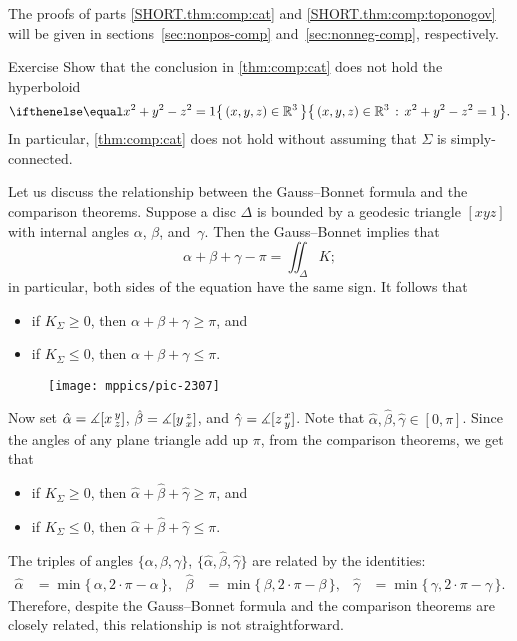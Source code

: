 The proofs of parts \ref{SHORT.thm:comp:cat} and \ref{SHORT.thm:comp:toponogov} will be given in sections~\ref{sec:nonpos-comp} and~\ref{sec:nonneg-comp}, respectively.

\begin{thm}{Exercise}\label{ex:thm:comp:cat:nsc}
Show that the conclusion in \ref{thm:comp:cat} does not hold the hyperboloid
\[\set{(x,y,z)\in\mathbb{R}^3}{x^2+y^2-z^2=1}.\]
In particular, \ref{thm:comp:cat} does not hold without assuming that $\Sigma$ is simply-connected.
\end{thm}

Let us discuss the relationship between the Gauss--Bonnet formula and the comparison theorems.
Suppose a disc $\Delta$ is bounded by a geodesic triangle $[xyz]$ with internal angles $\alpha$, $\beta$, and~$\gamma$.
Then the Gauss--Bonnet implies that 
\[\alpha+\beta+\gamma-\pi=\iint_\Delta K;\]
in particular, both sides of the equation have the same sign.
It follows that
\begin{itemize}
\item if $K_\Sigma\ge 0$, then $\alpha+\beta+\gamma\ge\pi$, and
\item if $K_\Sigma\le 0$, then $\alpha+\beta+\gamma\le\pi$.
\end{itemize}

\begin{wrapfigure}{r}{35mm}
\centering
\vskip-10mm
\texttt{[image: mppics/pic-2307]}
\end{wrapfigure}

Now set 
$\hat\alpha\z=\measuredangle\hinge {x}{y}{z}$,
$\hat\beta\z=\measuredangle\hinge {y}{z}{x}$,
and $\hat\gamma\z=\measuredangle\hinge {z}{x}{y}$.
Note that $\hat\alpha,\hat\beta,\hat\gamma\in[0,\pi]$.
Since the angles of any plane triangle add up $\pi$, from the comparison theorems, we get that
\begin{itemize}
\item if $K_\Sigma\ge 0$, then $\hat\alpha+\hat\beta+\hat\gamma\ge\pi$, and
\item if $K_\Sigma\le 0$, then $\hat\alpha+\hat\beta+\hat\gamma\le\pi$.
\end{itemize}

The triples of angles $\{ \alpha , \beta , \gamma \}$, $\{ \hat\alpha , \hat\beta , \hat\gamma \}$ are related by the identities:
\begin{align*}
\hat \alpha&=\min\{\,\alpha,2\cdot\pi-\alpha\,\},
&
\hat\beta &=\min\{\,\beta,2\cdot\pi-\beta\,\},
&
\hat\gamma&=\min\{\,\gamma,2\cdot\pi-\gamma\,\}.
\end{align*}
Therefore, despite the Gauss--Bonnet formula and the comparison theorems are closely related,
this relationship is not straightforward.

